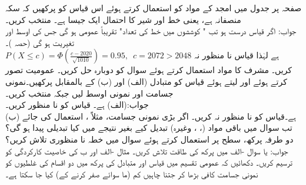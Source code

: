 \quad 
صفحہ  پر جدول  میں امجد کے مواد کو استعمال کرتے ہوئے اس قیاس کو پرکھیں کہ سکہ منصفانہ ہے، یعنی خط اور شیر کا احتمال ایک جیسا ہے۔ منتخب کریں۔\\
جواب:\quad
اگر قیاس  درست ہو تب " کوششوں میں خط کی تعداد" تقریباً عمومی ہو گی جس کی اوسط  اور تغیریت  ہو گی (حصہ )۔\\
$P(X\le c)=\Phi(\tfrac{c-2020}{\sqrt{1010}})=0.95,\,\,\,c=2072>2048$
ہے لہٰذا قیاس نا منظور نہ کریں۔
\quad
مشرف کا مواد استعمال کرتے ہوئے سوال  کو دوبارہ حل کریں۔
\quad
عمومیت تصور کرتے ہوئے اور  لیتے ہوئے قیاس  کو متبادل (الف)  اور (ب)  کے بالمقابل پرکھیں۔نمونی جسامت  اور نمونی اوسط  لیں جبکہ  منتخب کریں۔\\
جواب:\quad (الف)  ہے۔ قیاس کو نا منظور کریں۔\\
(ب)  ہے۔قیاس کو نا منظور نہ کریں۔
\quad
اگر بڑی نمونی جسامت، مثلاً ، استعمال کی جائے تب سوال  میں باقی مواد (، ، وغیرہ) تبدیل کیے بغیر نتیجے میں کیا تبدیلی پیدا ہو گی؟ 
\quad
دو طرفہ پرکھ،  سطح پر استعمال کرتے ہوئے سوال  میں خطہ نا منظوری تلاش کریں؟\\
جواب:\quad {} یا 
\quad
سوال -الف میں پرکھ کی طاقت تلاش کریں۔
\quad
مثال -الف اور ب کی خاصیت کارکردگی کو ترسیم کریں۔  
\quad
دکھائیں کہ عمومی تقسیم میں قیاس  اور متبادل  کی پرکھ میں  دو اقسام کی غلطیوں کو نمونی جسامت کافی بڑھا کر  جتنا چاہیں کم (ما سوائے صفر کرنے کے) کیا جا سکتا ہے۔
